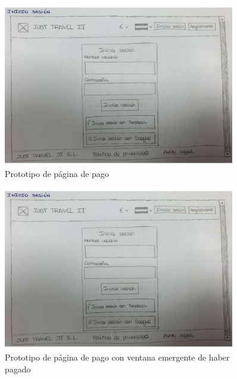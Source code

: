 \begin{figure}[H]
    \centering
    \includegraphics[page=9, width=0.9\textwidth]{./Imagenes/Prototipo/Prototipos definitivos - Iteracion I.pdf}
    \caption{Prototipo de página de pago}
    \label{fig:prot_pago}
\end{figure}

\begin{figure}[H]
    \centering
    \includegraphics[page=8, width=0.9\textwidth]{./Imagenes/Prototipo/Prototipos definitivos - Iteracion I.pdf}
    \caption{Prototipo de página de pago con ventana emergente de haber pagado}
    \label{fig:prot_pago_popup}
\end{figure}

